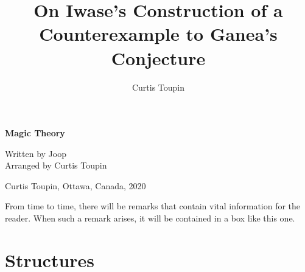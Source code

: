 \documentclass[1pt]{report}
\title{On Iwase's Construction of a Counterexample to Ganea's Conjecture}
\author{Curtis Toupin}
\date{}
\newcommand{\<}{\langle}
\renewcommand{\>}{\rangle}
\begin{document}
\pagestyle{fancy}
\begin{titlepage}
        \begin{center}
        \vspace*{1.0cm}

        \huge
        {\bf Magic Theory}

        \vspace*{1.25cm}

        \Large
        Written by Joop \\
        Arranged by Curtis Toupin \\

        \vspace*{1.5cm}

        \vspace*{2.5cm}
        \vspace*{0.5cm}

        {Curtis Toupin}, Ottawa, Canada, 2020\\
        \end{center}
\end{titlepage}
\shipout\null
\setcounter{page}{1}
\setcounter{tocdepth}{1}
\begin{rmkbox}
From time to time, there will be remarks that contain vital information for the reader. When such a remark arises, it will be contained in a box like this one.
\end{rmkbox}
\newpage
\tableofcontents
\newpage
\setcounter{page}{1}
\part{Structures}
\end{document}
